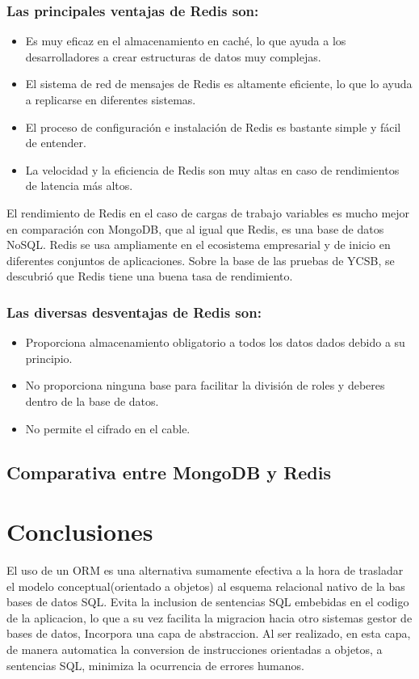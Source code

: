 \documentclass[twoside,twocolumn]{article}
\begin{document}
\subsubsection{Las principales ventajas de Redis son:}
\begin{itemize}
    \item   Es muy eficaz en el almacenamiento en caché, lo que ayuda a los desarrolladores a crear estructuras de datos muy complejas.
    \item	El sistema de red de mensajes de Redis es altamente eficiente, lo que lo ayuda a replicarse en diferentes sistemas.
    \item	El proceso de configuración e instalación de Redis es bastante simple y fácil de entender.
    \item	La velocidad y la eficiencia de Redis son muy altas en caso de rendimientos de latencia más altos.
    
\end{itemize}
El rendimiento de Redis en el caso de cargas de trabajo variables
es mucho mejor en comparación con MongoDB, que al igual que Redis,
 es una base de datos NoSQL. Redis se usa ampliamente en el ecosistema
  empresarial y de inicio en diferentes conjuntos de aplicaciones. Sobre
   la base de las pruebas de YCSB, se descubrió que Redis tiene una buena 
   tasa de rendimiento.


\subsubsection{Las diversas desventajas de Redis son:}
\begin{itemize}
    \item   Proporciona almacenamiento obligatorio a todos los datos dados debido a su principio.
    \item	No proporciona ninguna base para facilitar la división de roles y deberes dentro de la base de datos.
    \item	No permite el cifrado en el cable.
    
\end{itemize}

\subsection{Comparativa entre MongoDB y Redis}

\section{Conclusiones}
El uso de un ORM es una alternativa sumamente efectiva a la hora de trasladar el modelo conceptual(orientado a objetos)
al esquema relacional nativo de la bas bases de datos SQL. Evita la inclusion de sentencias SQL embebidas en el codigo de la aplicacion, lo que a su vez facilita la migracion
hacia otro sistemas gestor de bases de datos, Incorpora una capa de abstraccion. Al ser realizado, en esta capa, de manera automatica la conversion de 
instrucciones orientadas a objetos, a sentencias SQL, minimiza la ocurrencia de errores humanos.
\end{document}
